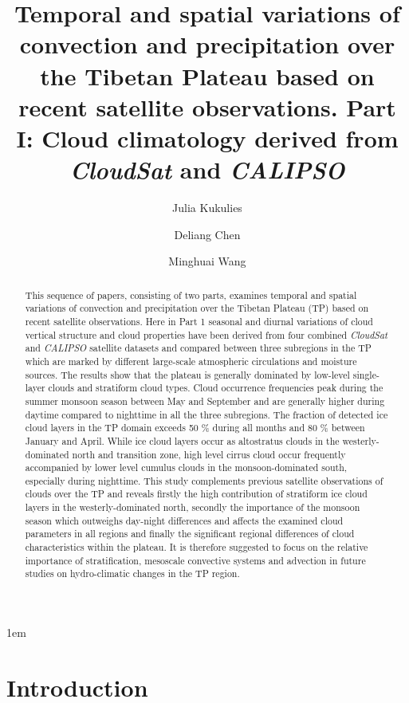 \documentclass[alpha-refs]{wiley-article}
\title{Temporal and spatial variations of convection and precipitation over the Tibetan Plateau based on recent satellite observations. Part I: Cloud climatology derived from \textit{CloudSat} and \textit{CALIPSO}}
\author[1\authfn{1}]{Julia Kukulies}
\author[1\authfn{1}]{Deliang Chen}
\author[2\authfn{1}]{Minghuai Wang}
\affil[1]{Regional Climate Group, Department of Earth Sciences, University of Gothenburg, Gothenburg, Sweden}
\affil[2]{School of Atmospheric Sciences, Nanjing University, Jiangsu, Nanjing, China}
\begin{document}
\openup 1em %

\maketitle

\begin{abstract}

This sequence of papers, consisting of two parts, examines temporal and spatial variations of convection and precipitation over the Tibetan Plateau (TP) based on recent satellite observations. Here in Part 1 seasonal and diurnal variations of cloud vertical structure and cloud properties have been derived from four combined \textit{CloudSat} and \textit{CALIPSO} satellite datasets and compared between three subregions in the TP which are marked by different large-scale atmospheric circulations and moisture sources. The results show that the plateau is generally dominated by low-level single-layer clouds and stratiform cloud types. Cloud occurrence frequencies peak during the summer monsoon season between May and September and are generally higher during daytime compared to nighttime in all the three subregions. The fraction of detected ice cloud layers in the TP domain exceeds 50 \% during all months and 80 \% between January and April. While ice cloud layers occur as altostratus clouds in the westerly-dominated north and transition zone, high level cirrus cloud occur frequently accompanied by lower level cumulus clouds in the monsoon-dominated south, especially during nighttime. This study complements previous satellite observations of clouds over the TP and reveals firstly the high contribution of stratiform ice cloud layers in the westerly-dominated north, secondly the importance of the monsoon season which outweighs day-night differences and affects the examined cloud parameters in all regions and finally the significant regional differences of cloud characteristics within the plateau. It is therefore suggested to focus on the relative importance of stratification, mesoscale convective systems and advection in future studies on hydro-climatic changes in the TP region.

\end{abstract}

\section{Introduction}
\linenumbers
\end{document}
